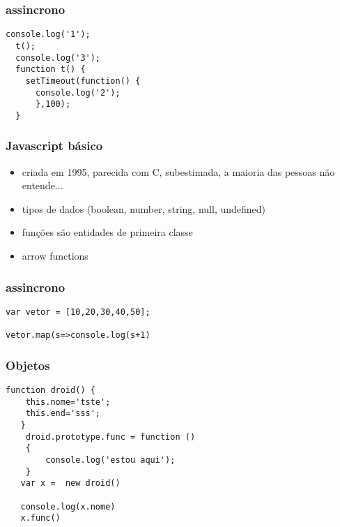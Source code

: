 \documentclass[14pt]{beamer}
\begin{document}
\begin{frame}[fragile]
 \frametitle{assincrono}
\begin{lstlisting}[basicstyle=\tiny\ttfamily]
  console.log('1');
  t();
  console.log('3');
  function t() {
    setTimeout(function() {
      console.log('2');
      },100);
  }
\end{lstlisting}

\end{frame}

\begin{frame}[fragile]
 \frametitle{Javascript básico}
\begin{itemize}
 \item criada em 1995, parecida com C, subestimada, a maioria das pessoas não entende...
 \item tipos de dados (boolean, number, string, null, undefined)
 \item funções são entidades de primeira classe
 \item arrow functions
\end{itemize}


\end{frame}
\begin{frame}[fragile]
 \frametitle{assincrono}
\begin{lstlisting}[basicstyle=\tiny\ttfamily]
var vetor = [10,20,30,40,50];

vetor.map(s=>console.log(s+1)
\end{lstlisting}

\end{frame}

\begin{frame}[fragile]
 \frametitle{Objetos}
\begin{lstlisting}[basicstyle=\tiny\ttfamily]
   function droid() {
    this.nome='tste';
    this.end='sss';
   }
    droid.prototype.func = function ()
    {
        console.log('estou aqui');
    }
   var x =  new droid()

   console.log(x.nome)
   x.func()
\end{lstlisting}

\end{frame}
\end{document}
